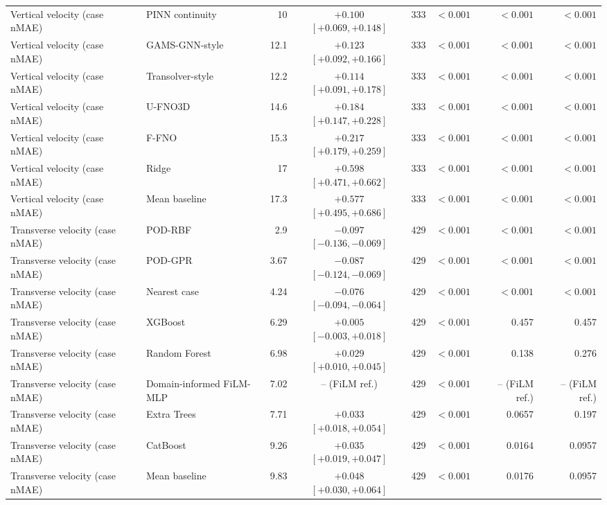 \begin{landscape}
\begin{longtable}{p{4.0cm}p{3.4cm}rcrrrr}
Vertical velocity (case nMAE) & PINN continuity & 10 & $+0.100$ $[+0.069, +0.148]$ & 333 & $< 0.001$ & $< 0.001$ & $< 0.001$ \\
Vertical velocity (case nMAE) & GAMS-GNN-style & 12.1 & $+0.123$ $[+0.092, +0.166]$ & 333 & $< 0.001$ & $< 0.001$ & $< 0.001$ \\
Vertical velocity (case nMAE) & Transolver-style & 12.2 & $+0.114$ $[+0.091, +0.178]$ & 333 & $< 0.001$ & $< 0.001$ & $< 0.001$ \\
Vertical velocity (case nMAE) & U-FNO3D & 14.6 & $+0.184$ $[+0.147, +0.228]$ & 333 & $< 0.001$ & $< 0.001$ & $< 0.001$ \\
Vertical velocity (case nMAE) & F-FNO & 15.3 & $+0.217$ $[+0.179, +0.259]$ & 333 & $< 0.001$ & $< 0.001$ & $< 0.001$ \\
Vertical velocity (case nMAE) & Ridge & 17 & $+0.598$ $[+0.471, +0.662]$ & 333 & $< 0.001$ & $< 0.001$ & $< 0.001$ \\
Vertical velocity (case nMAE) & Mean baseline & 17.3 & $+0.577$ $[+0.495, +0.686]$ & 333 & $< 0.001$ & $< 0.001$ & $< 0.001$ \\
Transverse velocity (case nMAE) & POD-RBF & 2.9 & $-0.097$ $[-0.136, -0.069]$ & 429 & $< 0.001$ & $< 0.001$ & $< 0.001$ \\
Transverse velocity (case nMAE) & POD-GPR & 3.67 & $-0.087$ $[-0.124, -0.069]$ & 429 & $< 0.001$ & $< 0.001$ & $< 0.001$ \\
Transverse velocity (case nMAE) & Nearest case & 4.24 & $-0.076$ $[-0.094, -0.064]$ & 429 & $< 0.001$ & $< 0.001$ & $< 0.001$ \\
Transverse velocity (case nMAE) & XGBoost & 6.29 & $+0.005$ $[-0.003, +0.018]$ & 429 & $< 0.001$ & 0.457 & 0.457 \\
Transverse velocity (case nMAE) & Random Forest & 6.98 & $+0.029$ $[+0.010, +0.045]$ & 429 & $< 0.001$ & 0.138 & 0.276 \\
Transverse velocity (case nMAE) & Domain-informed FiLM-MLP & 7.02 & -- (FiLM ref.) & 429 & $< 0.001$ & -- (FiLM ref.) & -- (FiLM ref.) \\
Transverse velocity (case nMAE) & Extra Trees & 7.71 & $+0.033$ $[+0.018, +0.054]$ & 429 & $< 0.001$ & 0.0657 & 0.197 \\
Transverse velocity (case nMAE) & CatBoost & 9.26 & $+0.035$ $[+0.019, +0.047]$ & 429 & $< 0.001$ & 0.0164 & 0.0957 \\
Transverse velocity (case nMAE) & Mean baseline & 9.83 & $+0.048$ $[+0.030, +0.064]$ & 429 & $< 0.001$ & 0.0176 & 0.0957 \\

\end{longtable}
\end{landscape}

